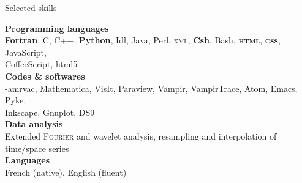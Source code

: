 \documentclass[a4paper,oneside]{cv}
\begin{document}
\begin{rubrique}{Selected skills}
~

\textbf{Programming languages}\\
\hspace*{1cm}\textbf{Fortran}, C, C++, \textbf{Python}, Idl, Java, Perl, \textsc{xml}, \textbf{Csh}, Bash, \textbf{\textsc{html}}, \textbf{\textsc{css}}, JavaScript, \\
\hspace*{1cm}CoffeeScript, {\sc html5}\\ 

\textbf{Codes \& softwares}\\
\hspace*{1cm}{\sc mpi}-{\sc amrvac}, Mathematica, VisIt, Paraview, Vampir, VampirTrace, Atom, Emacs, Pyke,\\
\hspace*{1cm}Inkscape, Gnuplot, DS9\\

\textbf{Data analysis}\\
\hspace*{1cm}Extended \textsc{Fourier} and wavelet analysis, resampling and interpolation of time/space series\\

\textbf{Languages}\\
\hspace*{1cm} French (native), English (fluent)

\end{rubrique}
\end{document}
